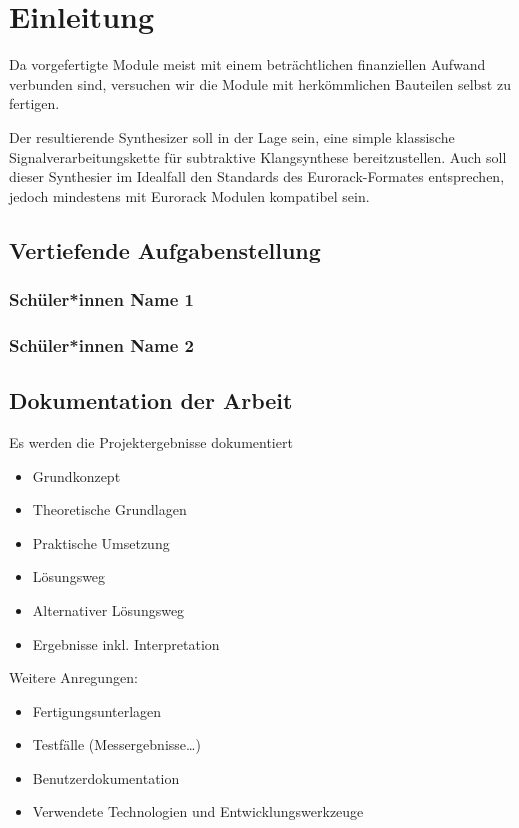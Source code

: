 \chapter{Einleitung}

Da vorgefertigte Module meist mit einem beträchtlichen finanziellen Aufwand verbunden sind, versuchen wir die Module mit herkömmlichen Bauteilen selbst zu fertigen.

Der resultierende Synthesizer soll in der Lage sein, eine simple klassische Signalverarbeitungskette für subtraktive Klangsynthese bereitzustellen. Auch soll dieser Synthesier im Idealfall den Standards des Eurorack-Formates entsprechen, jedoch mindestens mit Eurorack Modulen kompatibel sein.

\section{Vertiefende Aufgabenstellung}

\subsection{Schüler*innen Name 1}

\subsection{Schüler*innen Name 2}

\section{Dokumentation der Arbeit}

Es werden die Projektergebnisse dokumentiert

\begin{itemize}
	\item Grundkonzept
	\item Theoretische Grundlagen
	\item Praktische Umsetzung
	\item Lösungsweg
	\item Alternativer Lösungsweg
	\item Ergebnisse inkl. Interpretation
\end{itemize}

Weitere Anregungen:

\begin{itemize}
	\item Fertigungsunterlagen
	\item Testfälle (Messergebnisse…)
	\item Benutzerdokumentation
	\item Verwendete Technologien und Entwicklungswerkzeuge
\end{itemize}
